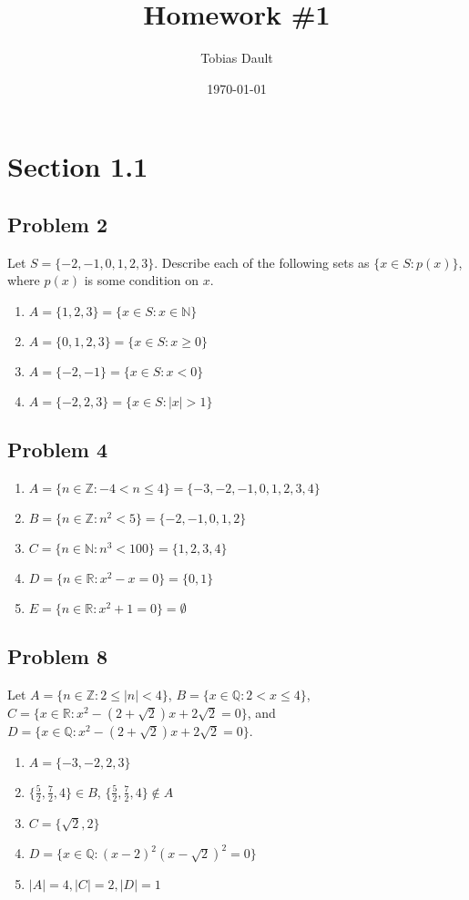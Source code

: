 \documentclass{article}
\title{Homework \#1}
\author{Tobias Dault}
\date{\today}
\newcommand{\Z}{\mathbb{Z}}
\newcommand{\R}{\mathbb{R}}
\newcommand{\Q}{\mathbb{Q}}
\begin{document}
	\maketitle 
	
	\section*{Section 1.1}
	\subsection*{Problem 2}
	Let $S=\{-2,-1,0,1,2,3\}$. Describe each of the following sets as $\{x\in S : p(x)\}$, where $p(x)$ is some condition on $x$.
	\begin{enumerate}[label=(\alph*)]
		\item $A=\{1,2,3\}=\{x\in S: x\in\mathbb{N}\}$
		\item $A=\{0,1,2,3\}=\{x\in S: x\geq0\}$
		\item $A=\{-2,-1\}=\{x\in S: x<0\}$
		\item $A=\{-2,2,3\}=\{x\in S: |x|>1\}$
	\end{enumerate}
	\subsection*{Problem 4}
	\begin{enumerate}[label=(\alph*)]
		\item $A=\{n\in\mathbb{Z}:-4<n\leq4\}=\{-3,-2,-1,0,1,2,3,4\}$
		\item $B=\{n\in\mathbb{Z}:n^2<5\}=\{-2,-1,0,1,2\}$
		\item $C=\{n\in\mathbb{N}:n^3<100\}=\{1,2,3,4\}$
		\item $D=\{n\in\mathbb{R}:x^2-x=0\}=\{0,1\}$
		\item $E=\{n\in\mathbb{R}:x^2+1=0\}=\emptyset$
	\end{enumerate}
	\subsection*{Problem 8}
	Let $A=\{n\in\Z:2\leq|n|<4\}$, $B=\{x\in\Q:2<x\leq4\}$, $C=\{x\in\R:x^2-(2+\sqrt{2})x+2\sqrt{2}=0\}$, and $D=\{x\in\Q:x^2-(2+\sqrt{2})x+2\sqrt{2}=0\}$.
	\begin{enumerate}[label=(\alph*)]
		\item $A=\{-3,-2,2,3\}$
		\item $\{\frac{5}{2},\frac{7}{2}, 4\}\in B$, $\{\frac{5}{2},\frac{7}{2}, 4\}\notin A$
		\item $C=\{\sqrt{2},2\}$
		\item $D=\{x\in\Q:(x-2)^2(x-\sqrt{2})^2=0\}$
		\item $|A|=4, |C|=2, |D|=1$
	\end{enumerate}
\end{document}
